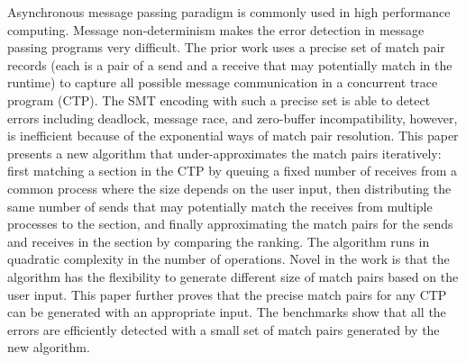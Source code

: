 Asynchronous message passing paradigm is commonly used in high performance computing.
Message non-determinism makes the error detection in message passing programs very difficult. The prior work uses a precise set of match pair records (each is a pair of a send and a receive that may potentially match in the runtime) to capture all possible message communication in a concurrent trace program (CTP). The SMT encoding with such a precise set is able to detect errors including deadlock, message race, and zero-buffer incompatibility, however, is inefficient because of the exponential ways of match pair resolution.
This paper presents a new algorithm that under-approximates the match pairs iteratively: first matching a section in the CTP by queuing a fixed number of receives from a common process where the size depends on the user input, then distributing the same number of sends that may potentially match the receives from multiple processes to the section, and finally approximating the match pairs for the sends and receives in the section by comparing the ranking. The algorithm runs in quadratic complexity in the number of operations. Novel in the work is that the algorithm has the flexibility to generate different size of match pairs based on the user input. This paper further proves that the precise match pairs for any CTP can be generated with an appropriate input. The benchmarks show that all the errors are efficiently detected with a small set of match pairs generated by the new algorithm.